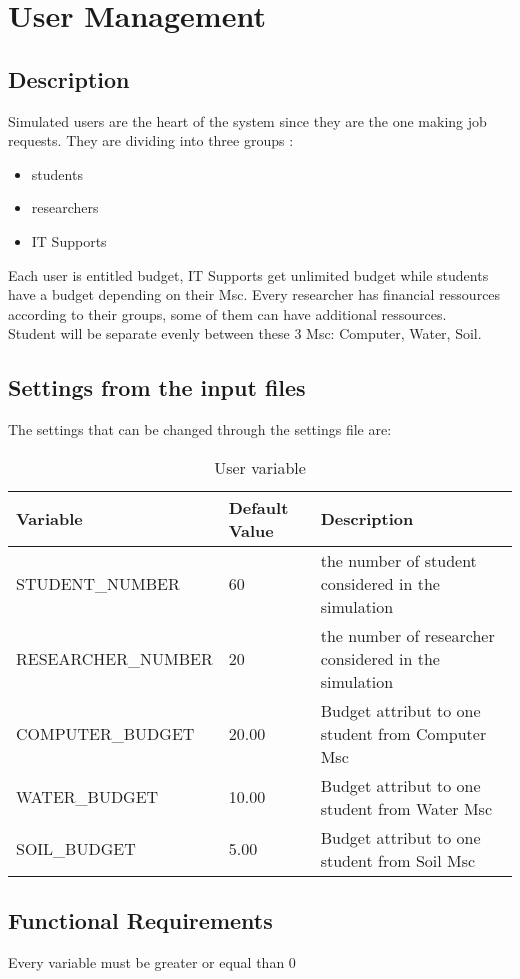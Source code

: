 \documentclass{scrreprt}
\begin{document}
\section{User Management}


\subsection{Description}
Simulated users are the heart of the system since they are the one making job requests. They are dividing into three groups :
\begin{itemize}
\item students
\item researchers
\item IT Supports
\end{itemize}
Each user is entitled budget, IT Supports get unlimited budget while students have a budget depending on their Msc. Every researcher has financial ressources according to their groups, some of them can have additional ressources.\\
Student will be separate evenly between these 3 Msc: Computer, Water, Soil.

\subsection{Settings from the input files}
The settings that can be changed through the settings file are:

\begin{table}[ht]
\centering
\caption{User variable}
\begin {tabular}{ l l l}
\toprule
Variable & Default Value & Description \\
\midrule
\midrule
 STUDENT_NUMBER & 60  & the number of student considered in the simulation \\
 RESEARCHER_NUMBER & 20 & the number of researcher considered in the simulation \\
 COMPUTER_BUDGET & 20.00  & Budget attribut to one student from Computer Msc \\
 WATER_BUDGET & 10.00  & Budget attribut to one student from Water Msc \\
 SOIL_BUDGET & 5.00  & Budget attribut to one student from Soil Msc \\
\bottomrule
\end {tabular}
\end{table}


\subsection{Functional Requirements}
Every variable must be greater or equal than 0
\end{document}
